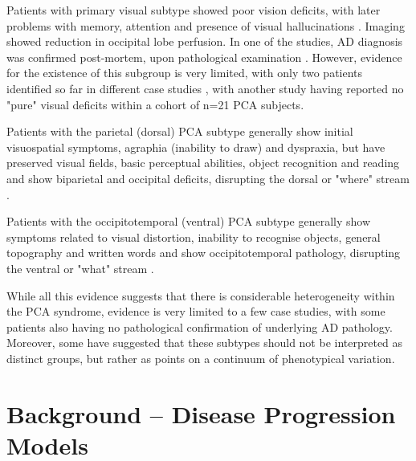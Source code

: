 Patients with primary visual subtype showed poor vision deficits, with later problems with memory, attention and presence of visual hallucinations \cite{galton2000atypical,levine1993visual}. Imaging showed reduction in occipital lobe perfusion. In one of the studies, AD diagnosis was confirmed post-mortem, upon pathological examination \cite{galton2000atypical}. However, evidence for the existence of this subgroup is very limited, with only two patients identified so far in different case studies \cite{levine1993visual,galton2000atypical}, with another study having reported no "pure" visual deficits within a cohort of n=21 PCA subjects\cite{lehmann2011basic}.

Patients with the parietal (dorsal) PCA subtype generally show initial visuospatial symptoms, agraphia (inability to draw) and dyspraxia, but have preserved visual fields, basic perceptual abilities, object recognition and reading and show biparietal and occipital deficits, disrupting the dorsal or "where" stream \cite{ross1996progressive,galton2000atypical}. 

Patients with the occipitotemporal (ventral) PCA subtype generally show symptoms related to visual distortion, inability to recognise objects, general topography and written words and show occipitotemporal pathology, disrupting the ventral or "what" stream \cite{ross1996progressive,galton2000atypical}.

While all this evidence suggests that there is considerable heterogeneity within the PCA syndrome, evidence is very limited to a few case studies, with some patients also having no pathological confirmation of underlying AD pathology. Moreover, some \cite{crutch2012posterior,lehmann2011basic} have suggested that these subtypes should not be interpreted as distinct groups, but rather as points on a continuum of phenotypical variation.

\chapter{Background -- Disease Progression Models}
\label{chapter:bckDpm}


